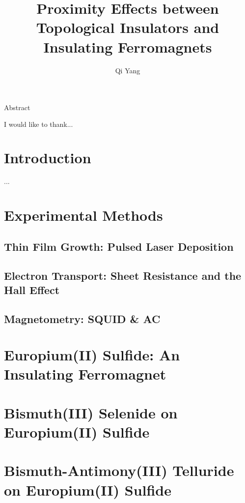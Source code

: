 \documentclass{report}
\begin{document}
\title{Proximity Effects between Topological Insulators and Insulating Ferromagnets}
\author{Qi Yang}

\beforepreface


    Abstract 


    I would like to thank...
\afterpreface

\captionsetup{width=0.95\columnwidth}%
\chapter{Introduction}
    ...
	
    
\chapter{Experimental Methods}
    \section{Thin Film Growth: Pulsed Laser Deposition}\label{sec:pld}
		
    \section{Electron Transport: Sheet Resistance and the Hall Effect}
		
    \section{Magnetometry: SQUID \& AC}

\chapter{Europium(II) Sulfide: An Insulating Ferromagnet}
\label{ch:EuS}

\chapter{Bismuth(III) Selenide on Europium(II) Sulfide}
\label{ch:bilayer2014}


\chapter{Bismuth-Antimony(III) Telluride on Europium(II) Sulfide}
\label{ch:bilayer2018}
\end{document}
